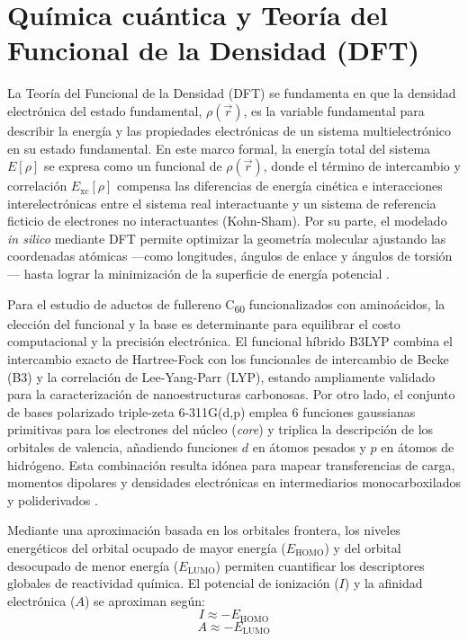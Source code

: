 \section{Química cuántica y Teoría del Funcional de la Densidad (DFT)}
La Teoría del Funcional de la Densidad (DFT) se fundamenta en que la densidad electrónica del estado fundamental, $\rho(\vec{r})$, es la variable fundamental para describir la energía y las propiedades electrónicas de un sistema multielectrónico en su estado fundamental. En este marco formal, la energía total del sistema $E[\rho]$ se expresa como un funcional de $\rho(\vec{r})$, donde el término de intercambio y correlación $E_{\text{xc}}[\rho]$ compensa las diferencias de energía cinética e interacciones interelectrónicas entre el sistema real interactuante y un sistema de referencia ficticio de electrones no interactuantes (Kohn-Sham). Por su parte, el modelado \textit{in silico} mediante DFT permite optimizar la geometría molecular ajustando las coordenadas atómicas —como longitudes, ángulos de enlace y ángulos de torsión— hasta lograr la minimización de la superficie de energía potencial \cite{kohn1965self}.

Para el estudio de aductos de fullereno C\textsubscript{60} funcionalizados con aminoácidos, la elección del funcional y la base es determinante para equilibrar el costo computacional y la precisión electrónica. El funcional híbrido B3LYP combina el intercambio exacto de Hartree-Fock con los funcionales de intercambio de Becke (B3) y la correlación de Lee-Yang-Parr (LYP), estando ampliamente validado para la caracterización de nanoestructuras carbonosas. Por otro lado, el conjunto de bases polarizado triple-zeta 6-311G(d,p) emplea 6 funciones gaussianas primitivas para los electrones del núcleo (\textit{core}) y triplica la descripción de los orbitales de valencia, añadiendo funciones $d$ en átomos pesados y $p$ en átomos de hidrógeno. Esta combinación resulta idónea para mapear transferencias de carga, momentos dipolares y densidades electrónicas en intermediarios monocarboxilados y poliderivados \cite{nikolaev2020thermodynamic, mico2024estudio}.

 Mediante una aproximación basada en los orbitales frontera, los niveles energéticos del orbital ocupado de mayor energía ($E_{\text{HOMO}}$) y del orbital desocupado de menor energía ($E_{\text{LUMO}}$) permiten cuantificar los descriptores globales de reactividad química. El potencial de ionización ($I$) y la afinidad electrónica ($A$) se aproximan según:
\begin{equation}
I \approx -E_{\text{HOMO}}
\end{equation}
\begin{equation}
A \approx -E_{\text{LUMO}}
\end{equation}

